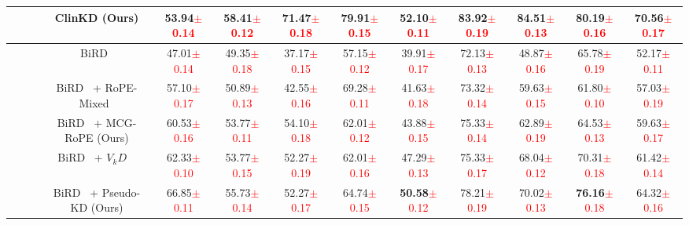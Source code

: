 \begin{table*}[t]
{\begin{tabular}{c|c|c|cccccccc|c}
\rowcolor[RGB]{255,245,235}
\cellcolor{white}\multirow{-6}{*}{\textbf{RC}}   &\cellcolor{white} \multirow{-6}{*}{SPICE~\cite{anderson2016spicesemanticpropositionalimage}} &ClinKD (Ours)& \textbf{53.94}\textcolor{red}{$\pm$0.14} & \textbf{58.41}\textcolor{red}{$\pm$0.12} & \textbf{71.47}\textcolor{red}{$\pm$0.18} & \textbf{79.91}\textcolor{red}{$\pm$0.15}& 52.10\textcolor{red}{$\pm$0.11} & \textbf{83.92}\textcolor{red}{$\pm$0.19} & \textbf{84.51}\textcolor{red}{$\pm$0.13} & \textbf{80.19}\textcolor{red}{$\pm$0.16} & \textbf{70.56}\textcolor{red}{$\pm$0.17} \\ \midrule

~  & ~ &BiRD~\cite{huang2024BiRD}& 47.01\textcolor{red}{$\pm$0.14} & 49.35\textcolor{red}{$\pm$0.18} & 37.17\textcolor{red}{$\pm$0.15} & 57.15\textcolor{red}{$\pm$0.12} & 39.91\textcolor{red}{$\pm$0.17} & 72.13\textcolor{red}{$\pm$0.13} & 48.87\textcolor{red}{$\pm$0.16} & 65.78\textcolor{red}{$\pm$0.19} & 52.17\textcolor{red}{$\pm$0.11} \\ 
~  & ~ &BiRD~\cite{huang2024BiRD} + RoPE-Mixed~\cite{heo2024rotarypositionembeddingvision} & 57.10\textcolor{red}{$\pm$0.17} & 50.89\textcolor{red}{$\pm$0.13} & 42.55\textcolor{red}{$\pm$0.16} & 69.28\textcolor{red}{$\pm$0.11} & 41.63\textcolor{red}{$\pm$0.18} & 73.32\textcolor{red}{$\pm$0.14} & 59.63\textcolor{red}{$\pm$0.15} & 61.80\textcolor{red}{$\pm$0.10} & 57.03\textcolor{red}{$\pm$0.19} \\ 
\rowcolor[RGB]{237,238,254}
\cellcolor{white}~  &\cellcolor{white} ~ &BiRD~\cite{huang2024BiRD} + MCG-RoPE (Ours)& 60.53\textcolor{red}{$\pm$0.16} & 53.77\textcolor{red}{$\pm$0.11} & 54.10\textcolor{red}{$\pm$0.18} & 62.01\textcolor{red}{$\pm$0.12} & 43.88\textcolor{red}{$\pm$0.15} & 75.33\textcolor{red}{$\pm$0.14} & 62.89\textcolor{red}{$\pm$0.19} & 64.53\textcolor{red}{$\pm$0.13} & 59.63\textcolor{red}{$\pm$0.17} \\ 
~  & ~ &BiRD~\cite{huang2024BiRD} + $V_{k}D$ ~\cite{Miles_2024_CVPR} & 62.33\textcolor{red}{$\pm$0.10} & 53.77\textcolor{red}{$\pm$0.15} & 52.27\textcolor{red}{$\pm$0.19} & 62.01\textcolor{red}{$\pm$0.16} & 47.29\textcolor{red}{$\pm$0.13} & 75.33\textcolor{red}{$\pm$0.17} & 68.04\textcolor{red}{$\pm$0.12} & 70.31\textcolor{red}{$\pm$0.18} & 61.42\textcolor{red}{$\pm$0.14} \\ 
\rowcolor[RGB]{237,238,254}
\cellcolor{white}~  & \cellcolor{white}~ &BiRD~\cite{huang2024BiRD} + Pseudo-KD (Ours)& 66.85\textcolor{red}{$\pm$0.11} & 55.73\textcolor{red}{$\pm$0.14} & 52.27\textcolor{red}{$\pm$0.17} & 64.74\textcolor{red}{$\pm$0.15} & \textbf{50.58}\textcolor{red}{$\pm$0.12} & 78.21\textcolor{red}{$\pm$0.19} & 70.02\textcolor{red}{$\pm$0.13} & \textbf{76.16}\textcolor{red}{$\pm$0.18} & 64.32\textcolor{red}{$\pm$0.16} \\ 

\end{tabular}}
\end{table*}
